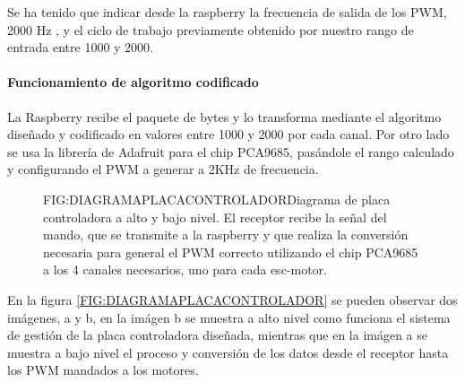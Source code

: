 Se ha tenido que indicar desde la raspberry la frecuencia de salida de los PWM, 2000 Hz , y el ciclo de trabajo previamente obtenido por nuestro rango de entrada entre 1000 y 2000.
\paragraph{Funcionamiento de algoritmo codificado}
La Raspberry recibe el paquete de bytes y lo transforma mediante el algoritmo diseñado y codificado en valores entre 1000 y 2000 por cada canal. Por otro lado se usa la librería de Adafruit para el chip PCA9685, pasándole el rango calculado y configurando el PWM a generar a 2KHz de frecuencia.


\begin{figure}[Diagrama placa controladora desarrollada]{FIG:DIAGRAMAPLACACONTROLADOR}{Diagrama de placa controladora a alto y bajo nivel. El receptor recibe la señal del mando, que se transmite a la raspberry y que realiza la conversión necesaria para general el PWM correcto utilizando el chip PCA9685 a los 4 canales necesarios, uno para cada esc-motor.}
\end{figure}

En la figura \ref{FIG:DIAGRAMAPLACACONTROLADOR} se pueden observar dos imágenes, a y b, en la imágen b se muestra a alto nivel como funciona el sistema de gestión de la placa controladora diseñada, mientras que en la imágen a se muestra a bajo nivel el proceso y conversión de los datos desde el receptor hasta los PWM mandados a los motores.

